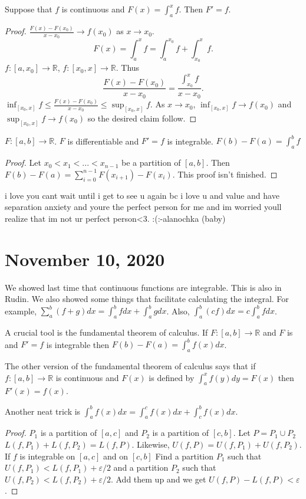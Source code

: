 \documentclass{article}
\newcommand{\R}{\mathbb{R}}
\newcommand{\eps}{\varepsilon}
\newcommand{\ra}[1][]{\xrightarrow{#1}}
\begin{document}
\begin{theorem}
Suppose that $f$ is continuous and $F(x)=\int_a^xf$. Then $F'=f$.
\end{theorem}
\begin{proof}
$\frac{F(x)-F(x_0)}{x-x_0}\ra f(x_0)$ as $x\ra x_0$. $$F(x)=\int_a^xf=\int_a^{x_0}f+\int_{x_0}^xf.$$ $f:[a,x_0]\ra \R$, $f:[x_0,x]\ra\R$. Thus $$\frac{F(x)-F(x_0)}{x-x_0}=\frac{\int_{x_0}^xf}{x-x_0}.$$ $\inf_{[x_0,x]}f\leq \frac{F(x)-F(x_0)}{x-x_0}\leq \sup_{[x_0,x]}f$. As $x\ra x_0$, $\inf_{[x_0,x]}f\ra f(x_0)$ and $\sup_{[x_0,x]}f\ra f(x_0)$ so the desired claim follow.
\end{proof}
\begin{theorem}
$F:[a,b]\ra\R$. $F$ is differentiable and $F'=f$ is integrable. $F(b)-F(a)=
\int_a^bf$
\end{theorem}
\begin{proof}
Let $x_0<x_1<...<x_{n-1}$ be a partition of $[a,b]$. Then $F(b)-F(a)=\sum_{i=0}^{n-1}F(x_{i+1})-F(x_i)$. This proof isn't finished.
\end{proof}
i love you cant wait until i get to see u again bc i love u and value and have separation anxiety and youre the perfect person for me and im worried youll realize that im not ur perfect person<3. :(:-alanochka (baby)
\section{November 10, 2020}
We showed last time that continuous functions are integrable. This is also in Rudin. We also showed some things that facilitate calculating the integral. For example, $\sum_a^b(f+g)dx=\int_a^bfdx+\int_a^bgdx$. Also, $\int_a^b(cf)dx=c\int_a^bfdx$.

A crucial tool is the fundamental theorem of calculus. If $F:[a,b]\ra \R$ and $F$ is and $F'=f$ is integrable then $F(b)-F(a)=\int_a^b f(x)dx$.

The other version of the fundamental theorem of calculus says that if $f:[a,b]\ra\R$ is continuous and $F(x)$ is defined by $\int_a^xf(y)dy=F(x)$ then $F'(x)=f(x)$.
\begin{lemma}
Another neat trick is $\int_a^bf(x)dx=\int_a^cf(x)dx+\int_c^bf(x)dx$.
\end{lemma}
\begin{proof}
$P_1$ is a partition of $[a,c]$ and $P_2$ is a partition of $[c,b]$. Let $P=P_1\cup P_2$ $L(f,P_1)+L(f,P_2)=L(f,P)$. Likewise, $U(f,P)=U(f,P_1)+U(f,P_2)$. If $f$ is integrable on $[a,c]$ and on $[c,b]$ Find a partition $P_1$ such that $U(f,P_1)<L(f,P_1)+\eps/2$ and a partition $P_2$ such that $U(f,P_2)<L(f,P_2)+\eps/2$. Add them up and we get $U(f,P)-L(f,P)<\eps$.
\end{proof}
\end{document}
